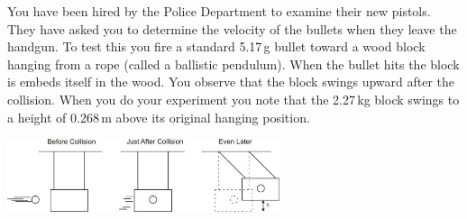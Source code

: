 \documentclass[letterpaper,addpoints,answers]{exam}
\begin{document}
\begin{questions}

\pagebreak

\question
You have been hired by the Police Department to examine their new pistols. They have asked you to determine the velocity of the bullets when they leave the handgun. To test this you fire a standard 5.17\,g bullet toward a wood block hanging from a rope (called a ballistic pendulum). When the bullet hits the block is embeds itself in the wood. You observe that the block swings upward after the collision. When you do your experiment you note that the 2.27\,kg block swings to a height of 0.268\,m above its original hanging position.

\begin{center}
 \includegraphics[width=0.6\textwidth]{final/ballistic_pendulum}
\end{center}

\end{questions}
\end{document}
